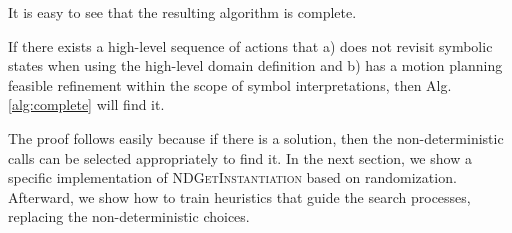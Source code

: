 It is easy to see that the resulting algorithm is complete.

\begin{thm}
If there exists a high-level sequence of actions that 
a) does not revisit symbolic states when using the high-level domain
definition and b) has a motion planning feasible refinement within the scope
of symbol interpretations, then Alg.\,\ref{alg:complete} will find it. 
\end{thm}

The proof follows easily because if there is a solution, then
the non-deterministic calls can be selected appropriately to find
it. In the next section, we show a specific implementation of \textsc{NDGetInstantiation}
based on randomization. Afterward, we show how to train
heuristics that guide the search processes, replacing the non-deterministic choices.



